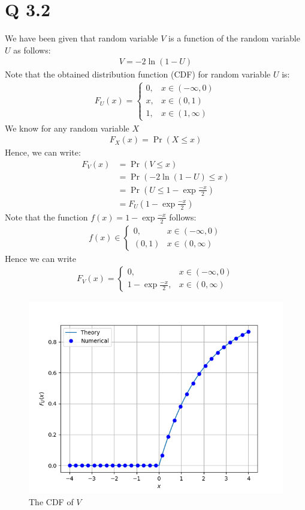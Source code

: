 \documentclass[journal,12pt,twocolumn]{IEEEtran}
\begin{document}
\section{Q 3.2}
We have been given that random variable $V$ is a function of the random variable $U$ as follows:
\begin{align}
    V = -2\ln{(1 - U)}
\end{align}
	Note that the obtained distribution function (CDF) for random variable $U$ is:
\begin{align}
    	F_U(x) =
	\begin{cases}
		0, & x \in (-\infty, 0) \\
		x, & x \in (0, 1) \\
		1, & x \in (1, \infty)
	\end{cases}
\end{align}
We know for any random variable $X$
\begin{align}
    F_X(x) = \Pr(X \leq x)
\end{align}
	Hence, we can write:
\begin{align}
	F_V(x) &= \Pr(V \leq x) \\
	&= \Pr(-2\ln{(1 - U)} \leq x)\\
	&= \Pr(U \leq 1 - \exp{\frac{-x}{2}})\\
	&= F_U(1 - \exp{\frac{-x}{2}})
\end{align}
Note that the function $f(x) = 1 - \exp{\frac{-x}{2}}$ follows:
\begin{align}
    f(x) \in
	\begin{cases}
	    {0}, & x \in (-\infty, 0) \\
	    (0, 1) & x \in (0, \infty)
	\end{cases}
\end{align}
Hence we can write
\begin{align}
	F_V(x) =
	\begin{cases}
	    0, & x \in (-\infty, 0) \\
	    1 - \exp{\frac{-x}{2}}, & x \in (0, \infty)
    	\end{cases}
\end{align}
\begin{figure}[!ht]
\centering
\includegraphics[width=\columnwidth]{./figs/Figure_Q4.png}
\caption{The CDF of $V$}
\label{fig:CDF_V}
\end{figure}
\end{document}
